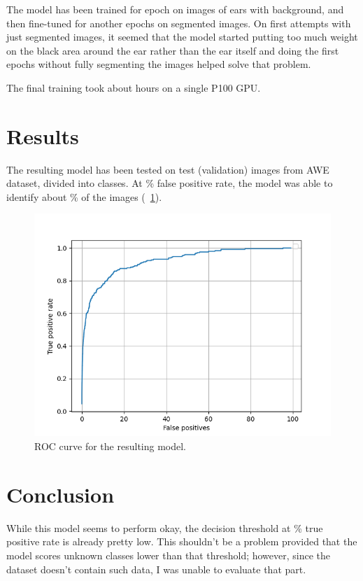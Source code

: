 \documentclass[9pt]{IEEEtran}
\begin{document}
The model has been trained for  epoch on images of ears with background, and then fine-tuned for another  epochs on segmented images. On first attempts with just segmented images, it seemed that the model started putting too much weight on the black area around the ear rather than the ear itself and doing the first  epochs without fully segmenting the images helped solve that problem. 

The final training took about  hours on a single P100 GPU.

\section{Results}

The resulting model has been tested on  test (validation) images from AWE dataset, divided into  classes. At \% false positive rate, the model was able to identify about \% of the images (\figurename~\ref{fig:roc}).

\begin{figure}[h]
    \centering
    \includegraphics[width=1\columnwidth]{roc.png}
    \caption{ROC curve for the resulting model.}
    \label{fig:roc}
\end{figure}

\section{Conclusion}

While this model seems to perform okay, the decision threshold at \% true positive rate is already pretty low. This shouldn't be a problem provided that the model scores unknown classes lower than that threshold; however, since the dataset doesn't contain such data, I was unable to evaluate that part.

%
%
\end{document}
